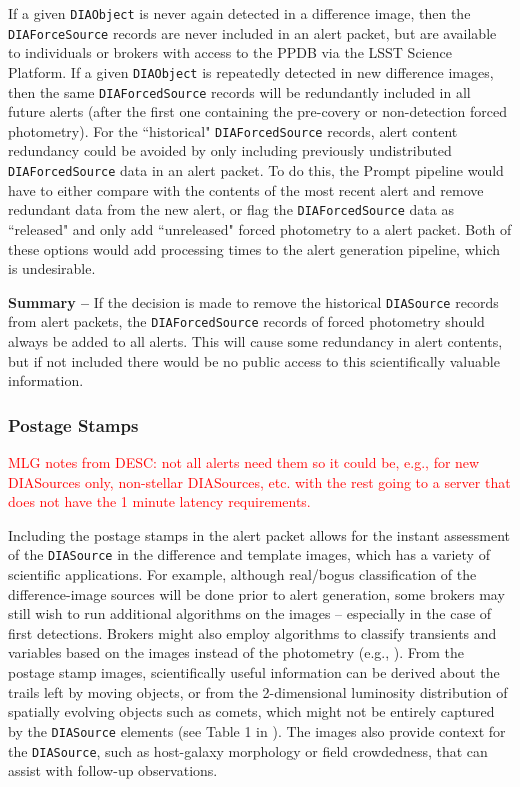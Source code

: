 \documentclass[DM,lsstdraft,authoryear,toc]{lsstdoc}
\begin{document}
If a given {\tt DIAObject} is never again detected in a difference image, then the {\tt DIAForceSource} records are never included in an alert packet, but are available to individuals or brokers with access to the PPDB via the LSST Science Platform.
If a given {\tt DIAObject} is repeatedly detected in new difference images, then the same {\tt DIAForcedSource} records will be redundantly included in all future alerts (after the first one containing the pre-covery or non-detection forced photometry).
For the ``historical" {\tt DIAForcedSource} records, alert content redundancy could be avoided by only including previously undistributed {\tt DIAForcedSource} data in an alert packet.
To do this, the Prompt pipeline would have to either compare with the contents of the most recent alert and remove redundant data from the new alert, or flag the {\tt DIAForcedSource} data as ``released" and only add ``unreleased" forced photometry to a alert packet.
Both of these options would add processing times to the alert generation pipeline, which is undesirable.

{\bf Summary --} If the decision is made to remove the historical {\tt DIASource} records from alert packets, the {\tt DIAForcedSource} records of forced photometry should always be added to all alerts.
This will cause some redundancy in alert contents, but if not included there would be no public access to this scientifically valuable information.

\subsubsection{Postage Stamps}\label{sssec:packets_remove_stamps}

\textcolor{red}{MLG notes from DESC: not all alerts need them so it could be, e.g., for new DIASources only, non-stellar DIASources, etc. with the rest going to a server that does not have the 1 minute latency requirements.}

Including the postage stamps in the alert packet allows for the instant assessment of the {\tt DIASource} in the difference and template images, which has a variety of scientific applications.
For example, although real/bogus classification of the difference-image sources will be done prior to alert generation, some brokers may still wish to run additional algorithms on the images -- especially in the case of first detections.
Brokers might also employ algorithms to classify transients and variables based on the images instead of the photometry (e.g., \citealt{2019PASP..131j8006C}).
From the postage stamp images, scientifically useful information can be derived about the trails left by moving objects, or from the 2-dimensional luminosity distribution of spatially evolving objects such as comets, which might not be entirely captured by the {\tt DIASource} elements (see Table 1 in ).
The images also provide context for the {\tt DIASource}, such as host-galaxy morphology or field crowdedness, that can assist with follow-up observations.
\end{document}
